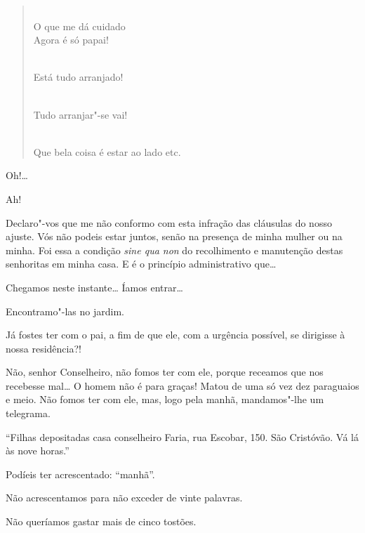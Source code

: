 \begin{verse}
\\
O que me dá cuidado\\  
Agora é só papai!

\\
Está tudo arranjado!

\\
Tudo arranjar"-se vai!

\\
Que bela coisa é estar ao lado etc.
\end{verse}





 Oh!\ldots{}

  Ah!

 Declaro"-vos que me não conformo com esta infração das cláusulas do
nosso ajuste. Vós não podeis estar juntos, senão na presença de minha mulher ou
na minha. Foi essa a condição \textit{sine qua non} do recolhimento e manutenção
destas senhoritas em minha casa. E é o princípio administrativo que\ldots{}

  Chegamos neste instante\ldots{} Íamos entrar\ldots{}

 Encontramo"-las no jardim. 

 Já fostes ter com o pai, a fim de que ele, com a urgência
possível, se dirigisse à nossa residência?!

 Não, senhor Conselheiro, não fomos ter com ele, porque receamos que
nos recebesse mal\ldots{} O homem não é para graças! Matou de uma só vez dez
paraguaios e meio. Não fomos ter com ele, mas, logo pela manhã, mandamos"-lhe um
telegrama.

 ``Filhas depositadas casa conselheiro Faria, rua Escobar, 150.
São Cristóvão. Vá lá às nove horas.''

 Podíeis ter acrescentado: ``manhã''.

 Não acrescentamos para não exceder de vinte palavras.

 Não queríamos gastar mais de cinco tostões.

